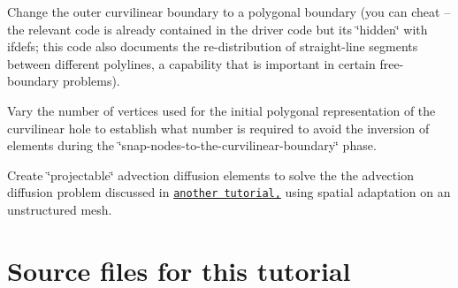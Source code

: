 \begin{DoxyEnumerate}
\item Change the outer curvilinear boundary to a polygonal boundary (you can cheat -- the relevant code is already contained in the driver code but it\textquotesingle{}s \char`\"{}hidden\char`\"{} with {\ttfamily ifdefs}; this code also documents the re-\/distribution of straight-\/line segments between different polylines, a capability that is important in certain free-\/boundary problems). ~\newline
~\newline

\item Vary the number of vertices used for the initial polygonal representation of the curvilinear hole to establish what number is required to avoid the inversion of elements during the \char`\"{}snap-\/nodes-\/to-\/the-\/curvilinear-\/boundary\char`\"{} phase. ~\newline
~\newline

\item Create \char`\"{}projectable\char`\"{} advection diffusion elements to solve the the advection diffusion problem discussed in \href{../../../../doc/advection_diffusion/two_d_adv_diff_adapt/html/index.html}{\tt another tutorial,} using spatial adaptation on an unstructured mesh. ~\newline
~\newline

\end{DoxyEnumerate}



 

\hypertarget{index_sources}{}\section{Source files for this tutorial}\label{index_sources}

